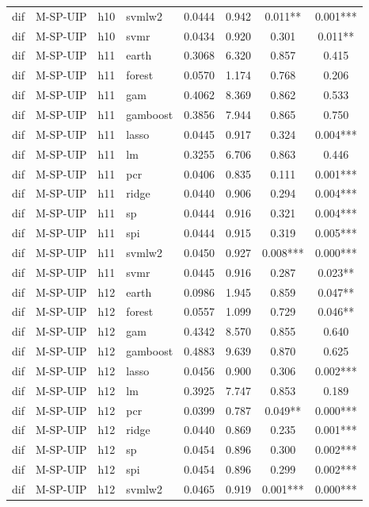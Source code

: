 \begin{ThreePartTable}
\begin{longtable}[t]{llclcccc}
dif & M-SP-UIP & h10 & svmlw2 & 0.0444 & 0.942 & 0.011** & 0.001***\\
dif & M-SP-UIP & h10 & svmr & 0.0434 & 0.920 & 0.301 & 0.011**\\
\addlinespace
dif & M-SP-UIP & h11 & earth & 0.3068 & 6.320 & 0.857 & 0.415\\
dif & M-SP-UIP & h11 & forest & 0.0570 & 1.174 & 0.768 & 0.206\\
dif & M-SP-UIP & h11 & gam & 0.4062 & 8.369 & 0.862 & 0.533\\
dif & M-SP-UIP & h11 & gamboost & 0.3856 & 7.944 & 0.865 & 0.750\\
dif & M-SP-UIP & h11 & lasso & 0.0445 & 0.917 & 0.324 & 0.004***\\
dif & M-SP-UIP & h11 & lm & 0.3255 & 6.706 & 0.863 & 0.446\\
dif & M-SP-UIP & h11 & pcr & 0.0406 & 0.835 & 0.111 & 0.001***\\
dif & M-SP-UIP & h11 & ridge & 0.0440 & 0.906 & 0.294 & 0.004***\\
dif & M-SP-UIP & h11 & sp & 0.0444 & 0.916 & 0.321 & 0.004***\\
dif & M-SP-UIP & h11 & spi & 0.0444 & 0.915 & 0.319 & 0.005***\\
dif & M-SP-UIP & h11 & svmlw2 & 0.0450 & 0.927 & 0.008*** & 0.000***\\
dif & M-SP-UIP & h11 & svmr & 0.0445 & 0.916 & 0.287 & 0.023**\\
\addlinespace
dif & M-SP-UIP & h12 & earth & 0.0986 & 1.945 & 0.859 & 0.047**\\
dif & M-SP-UIP & h12 & forest & 0.0557 & 1.099 & 0.729 & 0.046**\\
dif & M-SP-UIP & h12 & gam & 0.4342 & 8.570 & 0.855 & 0.640\\
dif & M-SP-UIP & h12 & gamboost & 0.4883 & 9.639 & 0.870 & 0.625\\
dif & M-SP-UIP & h12 & lasso & 0.0456 & 0.900 & 0.306 & 0.002***\\
dif & M-SP-UIP & h12 & lm & 0.3925 & 7.747 & 0.853 & 0.189\\
dif & M-SP-UIP & h12 & pcr & 0.0399 & 0.787 & 0.049** & 0.000***\\
dif & M-SP-UIP & h12 & ridge & 0.0440 & 0.869 & 0.235 & 0.001***\\
dif & M-SP-UIP & h12 & sp & 0.0454 & 0.896 & 0.300 & 0.002***\\
dif & M-SP-UIP & h12 & spi & 0.0454 & 0.896 & 0.299 & 0.002***\\
dif & M-SP-UIP & h12 & svmlw2 & 0.0465 & 0.919 & 0.001*** & 0.000***\\

\end{longtable}
\end{ThreePartTable}
